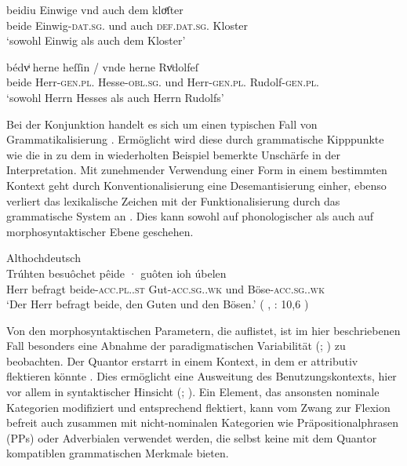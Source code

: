 \begin{exe}
\ex \label{ex:caoconjbeide}
	\begin{xlist}
	\ex \label{ex:caoconjbeide_1}
		\gll beidiu Einwige vnd auch dem kloͤſter \\
				beide Einwig-\textsc{dat.sg.\FemF} und auch
				\textsc{def.dat.sg.\NeutM} Kloster \\
		\trans `sowohl Einwig als auch dem Kloster'
			\parencites(Nr.~2925, Landshut, 1298)[219,34]{cao4}

	\ex \label{ex:caoconjbeide_2}
		\gll bédvͥ herne heſſin / vnde herne Rvͦdolfeſ \\
			beide Herr-\textsc{gen.pl.\MascM} Hesse-\textsc{obl.sg.\MascM} {}
				und Herr-\textsc{gen.pl.\MascM} Rudolf-\textsc{gen.pl.\MascM}
				\\
		\trans `sowohl Herrn Hesses als auch Herrn Rudolfs'
			\parencites(Nr.~1318, Freiburg i.\,Br., 1290)[561,11--12]{cao2}
	\end{xlist}
\end{exe}

Bei der Konjunktion  handelt es sich um einen typischen Fall von
Grammatikalisierung \autocite[vgl.][134--188]{lehmann2015}. Ermöglicht wird
diese durch grammatische Kipppunkte wie die in  zu dem
in  wiederholten Beispiel bemerkte Unschärfe in der
Interpretation. Mit zunehmender Verwendung einer Form in einem bestimmten
Kontext geht durch Konventionalisierung eine Desemantisierung einher, ebenso
verliert das lexikalische Zeichen mit der Funktionalisierung durch das
grammatische System an . Dies kann sowohl auf phonologischer als
auch auf morphosyntaktischer Ebene geschehen.

\begin{exe}
\ex \label{ex:beidejohahd_2_copy}
	\langinfo%
		{Althochdeutsch}%
		{}%
		{\cite[35]{tax1979}}\\
	\gll Trúhten besuôchet pêide · guôten ioh úbelen \\
			Herr befragt beide-\textsc{acc.pl.\MascA.st} {}
				Gut-\textsc{acc.sg.\MascA.wk} und
				Böse-\textsc{acc.sg.\MascA.wk} \\
		\trans `Der Herr befragt beide, den Guten und den Bösen.'
			(%
				, : 10,6
			)
\end{exe}

Von den morphosyntaktischen Parametern, die \citet[174]{lehmann2015} auflistet,
ist im hier beschriebenen Fall besonders eine Abnahme der paradigmatischen
Variabilität (; \cite[146--150]{lehmann2015}) zu
beobachten. Der Quantor erstarrt in einem Kontext, in dem er attributiv
flektieren könnte . Dies ermöglicht eine Ausweitung des
Benutzungskontexts, hier vor allem in syntaktischer Hinsicht (; \cite[150--151]{lehmann2015}). Ein Element, das
ansonsten nominale Kategorien modifiziert und entsprechend flektiert, kann vom
Zwang zur Flexion befreit auch zusammen mit nicht-nominalen Kategorien wie
Präpositionalphrasen (PPs) oder Adverbialen verwendet werden, die selbst keine
mit dem Quantor kompatiblen grammatischen Merkmale bieten.

